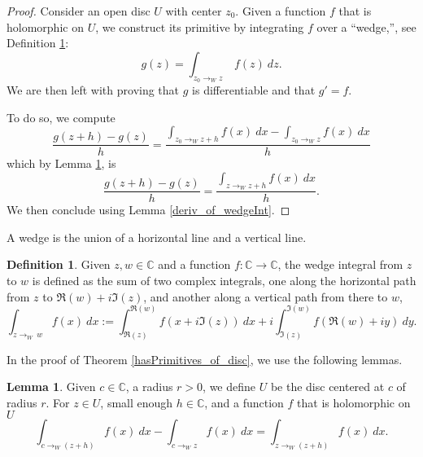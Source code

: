\documentclass{report}
\theoremstyle{definition}
\newtheorem{definition}{Definition}
\newtheorem{lemma}{Lemma}
\begin{document}
\begin{proof}
  Consider an open disc $U$ with center $z_0$.
  Given a function $f$ that is holomorphic on $U$, we construct its primitive by integrating $f$ over a ``wedge,'', see Definition \ref{WedgeInt}:
  \begin{equation}
    g(z)=\int_{z_0\to_W z}\ f(z)\ dz
    .
  \end{equation}
  We are then left with proving that $g$ is differentiable and that $g'=f$.

  To do so, we compute
  \begin{equation}
    \frac{g(z+h)-g(z)}h
    =
    \frac{\int_{z_0\to_W z+h} f(x)\ dx-\int_{z_0\to_W z} f(x)\ dx}h
  \end{equation}
  which by Lemma \ref{diff_of_wedges}, is
  \begin{equation}
    \frac{g(z+h)-g(z)}h
    =
    \frac{\int_{z\to_W z+h} f(x)\ dx}h
    .
  \end{equation}
  We then conclude using Lemma \ref{deriv_of_wedgeInt}.
\end{proof}

A wedge is the union of a horizontal line and a vertical line.

\begin{definition}
  \label{WedgeInt}
  \leanok
  Given $z,w\in\mathbb C$ and a function $f:\mathbb C\to\mathbb C$, the wedge integral from $z$ to $w$ is defined as the sum of two complex integrals, one along the horizontal path from $z$ to $\Re(w)+i \Im(z)$, and another along a vertical path from there to $w$,
   \begin{equation}
      \int_{z\to_W\  w} f(x)\ dx
      :=
      \int_{\Re(z)}^{\Re(w)} f(x+i\Im(z))\ dx
      +
      i\int_{\Im(z)}^{\Im(w)} f(\Re(w)+iy)\ dy
      .
   \end{equation}
\end{definition}

In the proof of Theorem \ref{hasPrimitives_of_disc}, we use the following lemmas.

\begin{lemma}
  \label{diff_of_wedges}
  \leanok
  Given $c\in\mathbb C$, a radius $r>0$, we define $U$ be the disc centered at $c$ of radius $r$.
  For $z\in U$, small enough $h\in \mathbb C$, and a function $f$ that is holomorphic on $U$
  \begin{equation}
    \int_{c\to_W (z+h)} f(x)\ dx
    -
    \int_{c\to_W z} f(x)\ dx
    =
    \int_{z\to_W (z+h)} f(x)\ dx
    .
  \end{equation}
\end{lemma}
\end{document}
